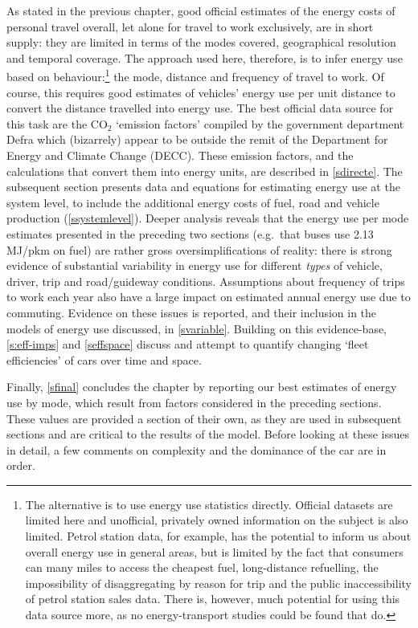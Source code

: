 \documentclass[a4paper, 11pt, twoside]{Thesis}
\begin{document}
As stated in the previous chapter, good official estimates of the energy costs of personal
travel overall, let alone for travel to work exclusively, are in short supply:
they are limited in terms of the modes covered, geographical resolution and
temporal coverage.
The approach used here, therefore, is to infer
energy use based on
behaviour:\footnote{The
alternative is to use energy use statistics directly.
Official datasets are limited here and unofficial, privately owned
information on the subject is also limited. Petrol
station data, for example,
has the potential to inform us about overall energy use in
general areas, but is limited by the fact that consumers can many miles to
access the cheapest fuel, long-distance refuelling, the impossibility
of disaggregating by reason for trip and the public inaccessibility of petrol
station sales data. There is, however, much potential for using this data
source more, as no energy-transport studies could be found that do.
}
the mode, distance and frequency of
travel to work. Of course, this requires good estimates of vehicles' energy use
per unit distance to convert the distance travelled into energy use. The best
official data source for this task are the CO$_2$ `emission factors'
compiled by the government department Defra which (bizarrely) appear
to be outside the remit of
the Department for Energy and Climate Change (DECC).
These emission factors, and the calculations that convert them into
energy units, are described in \cref{sdirecte}. The subsequent section presents
data and equations for estimating energy use at the system level, to include
the additional energy costs of fuel, road and vehicle production
(\cref{ssystemlevel}). Deeper analysis reveals that the energy use per mode
estimates presented in the preceding two sections
(e.g.~that buses use 2.13 MJ/pkm on fuel) are rather gross oversimplifications
of reality: there is strong evidence of substantial variability in energy use
for different \emph{types} of vehicle, driver, trip and road/guideway
conditions. Assumptions about frequency of trips to work each year also
have a large impact on estimated annual energy use due to commuting.
Evidence on these issues is reported, and their inclusion in the models
of energy use discussed, in \cref{svariable}. Building on this evidence-base,
\cref{s:eff-imps} and \cref{seffspace} discuss and attempt to quantify
changing `fleet efficiencies' of cars over time and space. 

Finally, \cref{sfinal} concludes the chapter by reporting our best
estimates of energy use by mode,
which result from factors considered in the preceding sections. These
values are provided a section of their own, as they are used in subsequent
sections and are critical to the results of the model. Before looking at these
issues in detail, a few comments on complexity and the dominance of the car are
in order.
\end{document}
